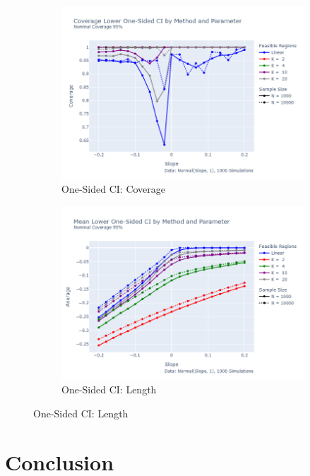 \documentclass[12pt,a4paper,english]{article} %
\numberwithin{equation}{section}
\theoremstyle{definition}
\theoremstyle{remark}
\theoremstyle{plain}
\begin{document}
\begin{figure}
      \begin{subfigure}[b]{0.49\textwidth}
        \centering
        \includegraphics[width=\textwidth]{../figures/relax/covers_lower_one_sided_by_method.png}
        \caption{One-Sided CI: Coverage}\label{fig:convex_relax_ci_coverage}
      \end{subfigure}
      \hfill
      \begin{subfigure}[b]{0.49\textwidth}
        \centering
        \includegraphics[width=\textwidth]{../figures/relax/lower_ci_one_sided_by_method.png}
      \caption{One-Sided CI: Length}\label{fig:convex_relax_ci_length}
  \end{subfigure}

\end{figure}

\section{Conclusion}
\end{document}
